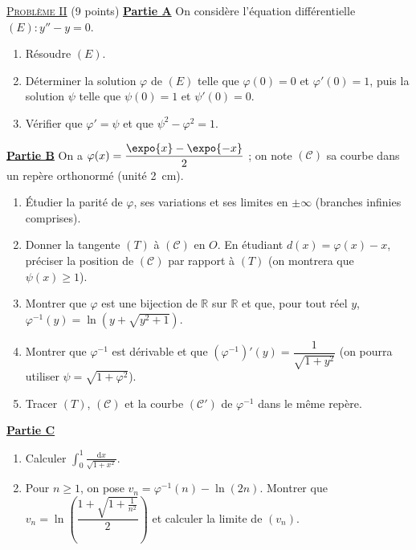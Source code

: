 \noindent \underline{\textsc{Probl\`eme II}} (9 points) \newline
\underline{\textbf{Partie A}} \newline
On consid\`ere l'\'equation diff\'erentielle $(E) : y'' - y = 0$.
\begin{enumerate}
      \item R\'esoudre $(E)$.
      \item D\'eterminer la solution $\varphi$ de $(E)$ telle que $\varphi(0) = 0$ et $\varphi'(0) = 1$, puis la solution $\psi$ telle que
            $\psi(0) = 1$ et $\psi'(0) = 0$.
      \item V\'erifier que $\varphi' = \psi$ et que $\psi^2 - \varphi^2 = 1$.
\end{enumerate}
\underline{\textbf{Partie B}} \newline
On a $\varphi(x) = \dfrac{\expo{x} - \expo{-x}}{2}$ ; on note $(\mathscr{C})$ sa courbe dans un rep\`ere orthonorm\'e (unit\'e 2~cm).
\begin{enumerate}
      \item \'Etudier la parit\'e de $\varphi$, ses variations et ses limites en $\pm\infty$ (branches infinies comprises).
      \item Donner la tangente $(T)$ \`a $(\mathscr{C})$ en $O$. En \'etudiant $d(x) = \varphi(x) - x$, pr\'eciser la position de $(\mathscr{C})$ par rapport
            \`a $(T)$ (on montrera que $\psi(x) \geq 1$).
      \item Montrer que $\varphi$ est une bijection de $\mathbb{R}$ sur $\mathbb{R}$ et que, pour tout r\'eel $y$,
            $\varphi^{-1}(y) = \ln\left(y + \sqrt{y^2 + 1}\right)$.
      \item Montrer que $\varphi^{-1}$ est d\'erivable et que $(\varphi^{-1})'(y) = \dfrac{1}{\sqrt{1 + y^2}}$
            (on pourra utiliser $\psi = \sqrt{1 + \varphi^2}$).
      \item Tracer $(T)$, $(\mathscr{C})$ et la courbe $(\mathscr{C}')$ de $\varphi^{-1}$ dans le m\^eme rep\`ere.
\end{enumerate}
\underline{\textbf{Partie C}}
\begin{enumerate}
      \item Calculer $\displaystyle\int_0^1 \frac{\mathrm{d}x}{\sqrt{1 + x^2}}$.
      \item Pour $n \geq 1$, on pose $v_n = \varphi^{-1}(n) - \ln(2n)$. Montrer que $v_n = \ln\left(\dfrac{1 + \sqrt{1 + \frac{1}{n^2}}}{2}\right)$
            et calculer la limite de $(v_n)$.
\end{enumerate}


